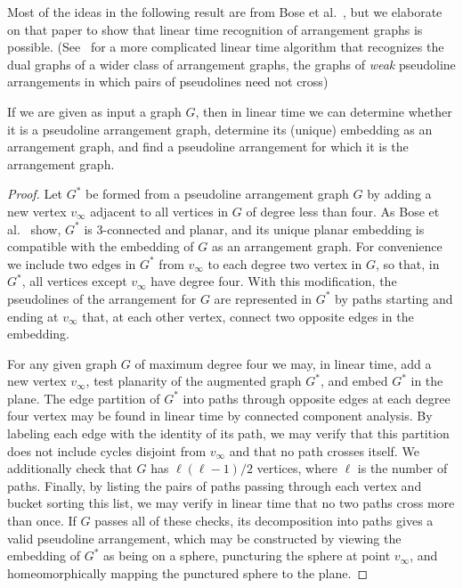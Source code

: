 \documentclass[oribibl]{llncs}
\begin{document}
Most of the ideas in the following result are from Bose et al.~\cite{BosEveWis-IJCGA-03},
but we elaborate on that paper to show that linear time recognition of arrangement graphs is possible. (See~\cite{Epp-GD-04} for a more complicated linear time algorithm that recognizes the dual graphs of a wider class of arrangement graphs, the graphs of \emph{weak} pseudoline arrangements in which pairs of pseudolines need not cross)

\begin{lemma}
\label{lem:test-arrangement}
If we are given as input a graph $G$, then in linear time we can determine whether it is a pseudoline arrangement graph, determine its (unique) embedding as an arrangement graph, and find a pseudoline arrangement for which it is the arrangement graph.
\end{lemma}

\begin{proof}
Let $G^*$ be formed from a pseudoline arrangement graph $G$ by adding a new vertex $v_\infty$ adjacent to all vertices in $G$ of degree less than four. As Bose et al.~\cite{BosEveWis-IJCGA-03} show, $G^*$ is 3-connected and planar, and its unique planar embedding is compatible with the embedding of $G$ as an arrangement graph. For convenience we include two edges in $G^*$ from $v_\infty$ to each degree two vertex in $G$, so that, in $G^*$, all vertices except $v_\infty$ have degree four. With this modification, the pseudolines of the arrangement for $G$ are represented in $G^*$ by paths starting and ending at $v_\infty$ that, at each other vertex, connect two opposite edges in the embedding.

For any given graph $G$ of maximum degree four we may, in linear time, add a new vertex $v_\infty$, test planarity of the augmented graph $G^*$, and embed $G^*$ in the plane. The edge partition of $G^*$ into paths through opposite edges at each degree four vertex may be found in linear time by connected component analysis. By labeling each edge with the identity of its path, we may verify that this partition does not include cycles disjoint from $v_\infty$ and that no path crosses itself. We additionally check that $G$ has $\ell(\ell-1)/2$ vertices, where $\ell$ is the number of paths. Finally, by listing the pairs of paths passing through each vertex and bucket sorting this list, we may verify in linear time that no two paths cross more than once. If $G$ passes all of these checks, its decomposition into paths gives a valid pseudoline arrangement, which may be constructed by viewing the embedding of $G^*$ as being on a sphere, puncturing the sphere at point $v_\infty$, and homeomorphically mapping the punctured sphere to the plane. 
\end{proof}
\end{document}
